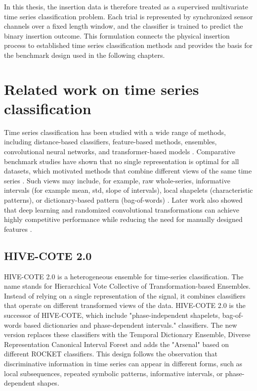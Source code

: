 In this thesis, the insertion data is therefore treated as a supervised multivariate time series classification problem. Each trial is represented by synchronized sensor channels over a fixed length window, and the classifier is trained to predict the binary insertion outcome. This formulation connects the physical insertion process to established time series classification methods and provides the basis for the benchmark design used in the following chapters.

\section{Related work on time series classification} \label{sec:tsc}

Time series classification has been studied with a wide range of methods, including distance-based classifiers, feature-based methods, ensembles, convolutional neural networks, and transformer-based models \cite{bagnallGreatTimeSeries2017,faouziTimeSeriesClassification2024}. Comparative benchmark studies have shown that no single representation is optimal for all datasets, which motivated methods that combine different views of the same time series \cite{bagnallGreatTimeSeries2017}. Such views may include, for example, raw whole-series, informative intervals (for example mean, std, slope of intervals), local shapelets (characteristic patterns), or dictionary-based pattern (bag-of-words) \cite{bagnallGreatTimeSeries2017}. Later work also showed that deep learning and randomized convolutional transformations can achieve highly competitive performance while reducing the need for manually designed features \cite{fawazDeepLearningTime2019,dempsterROCKETExceptionallyFast2020,ismailfawazInceptionTimeFindingAlexNet2020}.

\subsection{HIVE-COTE 2.0 \cite{middlehurstHIVECOTE20New2021}}

HIVE-COTE 2.0 is a heterogeneous ensemble for time-series classification. The name stands for Hierarchical Vote Collective of Transformation-based Ensembles. Instead of relying on a single representation of the signal, it combines classifiers that operate on different transformed views of the data. HIVE-COTE 2.0 is the successor of HIVE-COTE, which include "phase-independent shapelets, bag-of-words based dictionaries and phase-dependent intervals." \cite{middlehurstHIVECOTE20New2021} classifiers. The new version replaces these classifiers with the Temporal Dictionary Ensemble, Diverse Representation Canonical Interval Forest and adds the "Arsenal" based on different ROCKET classifiers. This design follows the observation that discriminative information in time series can appear in different forms, such as local subsequences, repeated symbolic patterns, informative intervals, or phase-dependent shapes.

